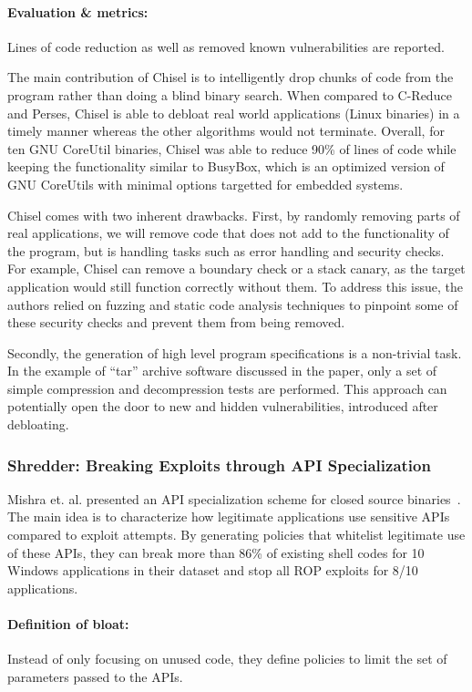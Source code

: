 \paragraph{Evaluation \& metrics:} Lines of code reduction as well as removed known vulnerabilities are reported.

The main contribution of Chisel is to intelligently drop chunks of code from the program rather than doing a blind binary search. When compared to C-Reduce and Perses, Chisel is able to debloat real world applications (Linux binaries) in a timely manner whereas the other algorithms would not terminate. Overall, for ten GNU CoreUtil binaries, Chisel was able to reduce 90\% of lines of code while keeping the functionality similar to BusyBox, which is an optimized version of GNU CoreUtils with minimal options targetted for embedded systems.

Chisel comes with two inherent drawbacks. First, by randomly removing parts of real applications, we will remove code that does not add to the functionality of the program, but is handling tasks such as error handling and security checks.
For example, Chisel can remove a boundary check or a stack canary, as the target application would still function correctly without them. To address this issue, the authors relied on fuzzing and static code analysis techniques to pinpoint some of these
security checks and prevent them from being removed.

Secondly, the generation of high level program specifications is a non-trivial task. In the example of ``tar'' archive software discussed in the paper, only a set of simple compression and decompression tests are performed. This approach can potentially open the door to new and hidden vulnerabilities, introduced after debloating.

\subsubsection{Shredder: Breaking Exploits through API Specialization}
Mishra et. al. presented an API specialization scheme for closed source binaries~\cite{mishra2018shredder}. The main idea is to characterize how legitimate applications use sensitive APIs compared to exploit attempts. By generating policies that
whitelist legitimate use of these APIs, they can break more than 86\% of existing shell codes for 10 Windows applications in their dataset and stop all ROP exploits for 8/10 applications.

\paragraph{Definition of bloat:} Instead of only focusing on unused code, they define policies to limit the set of parameters passed to the APIs.

